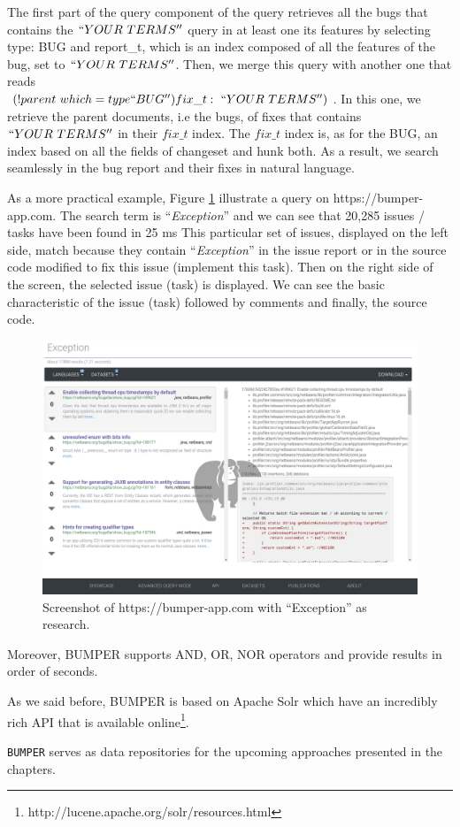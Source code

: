 The first part of the query component of the query retrieves all the bugs that contains the $``YOUR~TERMS''$ query in at least one its features by selecting type: BUG and report\_t, which is an index composed of all the features of the bug, set to $``YOUR~TERMS''$.
Then, we merge this query with another one that reads \\
$(!parent~which=type``BUG'')fix\_t:~``YOUR~TERMS'')$.
In this one, we retrieve the parent documents, i.e the bugs, of fixes that contains $``YOUR~TERMS''$ in their $fix\_t$ index.
The $fix\_t$ index is, as for the BUG, an index based on all the fields of changeset and hunk both. As a result, we search seamlessly in the bug report and their fixes in natural language.

As a more practical example, Figure \ref{fig:bumper-live} illustrate a query on https://bumper-app.com. The search term is  ``{\it Exception}'' and we can see that 20,285 issues / tasks have been found in 25 ms This particular set of issues, displayed on the left side, match because they contain ``{\it Exception}'' in the issue report or in the source code modified to fix this issue (implement this task). Then on the right side of the screen, the selected issue (task) is displayed. We can see the basic characteristic of the issue (task) followed by comments and finally, the source code.

\begin{figure}[h!]
  \centering
    \includegraphics[scale=0.3]{media/bumper-live.png}
    \caption{Screenshot of https://bumper-app.com with ``Exception'' as research.
    \label{fig:bumper-live}}
\end{figure}


Moreover, BUMPER supports AND, OR, NOR operators and provide results in order of seconds.

As we said before, BUMPER is based on Apache Solr which have an incredibly rich API that is available online\footnote{ http://lucene.apache.org/solr/resources.html}.

{\tt BUMPER} serves as data repositories for the upcoming approaches presented in the chapters.
